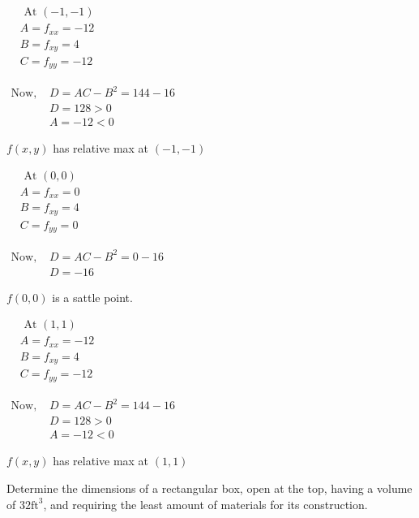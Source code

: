 \documentclass[12pt]{article}
\begin{document}
\begin{multicols}{3}
$\begin{aligned}
& \text { At }(-1,-1) \\
& A=f_{x x}=-12 \\
& B=f_{x y}=4 \\
& C=f_{y y}=-12
\end{aligned}$

$\begin{aligned}
   \text{Now, } & D = AC-B^2 =144-16 \\
   & D =128>0 \\
   & A =-12<0
\end{aligned}$

$f(x, y)$ has relative max at $(-1,-1)$

\columnbreak

$\begin{aligned}
& \text { At }(0,0) \\
& A = f_{x x}=0 \\
& B = f_{x y}=4 \\
& C = f_{y y}=0
\end{aligned}$

$\begin{aligned}
\text{Now, } & D = AC-B^2 = 0 - 16\\
& D = -16
\end{aligned}$

$f(0,0)$ is a sattle point.

\columnbreak

$\begin{aligned}
   & \text { At }(1,1) \\
   & A=f_{x x}=-12 \\
   & B=f_{x y}=4 \\
   & C=f_{y y}=-12
   \end{aligned}$
   
   $\begin{aligned}
      \text{Now, } & D = AC-B^2 =144-16 \\
      & D =128>0 \\
      & A =-12<0
   \end{aligned}$
   
   $f(x, y)$ has relative max at $(1,1)$
\end{multicols}


\pagebreak
\textbf{\mred{\#}} Determine the dimensions of a rectangular box, open at the top, having a volume of $32 \mathrm{ft}^3$, and requiring the least amount of materials for its construction.
\end{document}
